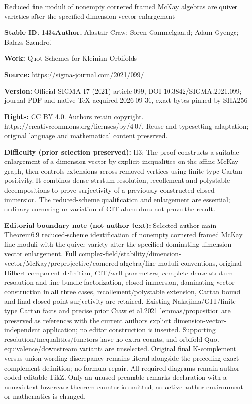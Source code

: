 \documentclass[11pt]{article}
\numberwithin{equation}{section}
\numberwithin{equation}{section}
\begin{document}
\begin{center}\Large Reduced fine moduli of nonempty cornered framed McKay algebras are quiver varieties after the specified dimension-vector enlargement\end{center}
\noindent\textbf{Stable ID:} 1434\quad\textbf{Author:} Alastair Craw; Soren Gammelgaard; Adam Gyenge; Balazs Szendroi\par
\noindent\textbf{Work:} Quot Schemes for Kleinian Orbifolds\par
\noindent\textbf{Source:} \url{https://sigma-journal.com/2021/099/}\par
\noindent\textbf{Version:} Official SIGMA 17 (2021) article 099, DOI 10.3842/SIGMA.2021.099; journal PDF and native TeX acquired 2026-09-30, exact bytes pinned by SHA256\par
\noindent\textbf{Rights:} CC BY 4.0. Authors retain copyright. \url{https://creativecommons.org/licenses/by/4.0/}. Reuse and typesetting adaptation; original language and mathematical content preserved.\par
\noindent\textbf{Difficulty (prior selection preserved):} {\CJKfont H3: The proof constructs a suitable enlargement of a dimension vector by explicit inequalities on the affine McKay graph, then controls extensions across removed vertices using finite-type Cartan positivity. It combines dense-stratum resolution, recollement and polystable decompositions to prove surjectivity of a previously constructed closed immersion. The reduced-scheme qualification and enlargement are essential; ordinary cornering or variation of GIT alone does not prove the result.}\par
\medskip\noindent\textbf{Editorial boundary note (not author text):} Selected author-main Theorem6.9 reduced-scheme identification of nonempty cornered framed McKay fine moduli with the quiver variety after the specified dominating dimension-vector enlargement. Full complex-field/stability/dimension-vector/McKay/preprojective/cornered algebra/fine-moduli conventions, original Hilbert-component definition, GIT/wall parameters, complete dense-stratum resolution and line-bundle factorization, closed immersion, dominating vector construction in all three cases, recollement/polystable extension, Cartan bound and final closed-point surjectivity are retained. Existing Nakajima/GIT/finite-type Cartan facts and precise prior Craw et al.2021 lemmas/proposition are preserved as references with the current authors explicit dimension-vector-independent application; no editor construction is inserted. Supporting resolution/inequalities/functors have no extra counts, and orbifold Quot equivalence/downstream variants are unselected. Original final K-complement versus union wording discrepancy remains literal alongside the preceding exact complement definition; no formula repair. All required diagrams remain author-coded editable TikZ. Only an unused preamble remarks declaration with a nonexistent lowercase theorem counter is omitted; no active author environment or mathematics is changed.\par
\end{document}
